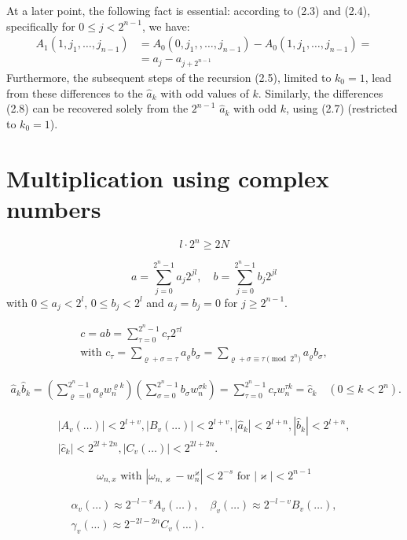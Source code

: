 \documentclass{article}
\begin{document}
At a later point, the following fact is essential: according to (2.3) and (2.4), specifically for $0 \le j < 2^{n - 1}$, we have:
\begin{align*}
\tag{2.8}
A_1(1, j_1, \ldots, j_{n - 1}) &= A_0(0, j_1,, \ldots, j_{n - 1}) - A_0(1, j_1, \ldots, j_{n - 1})  = \\
&= a_j - a_{j + 2^{n - 1}}
\end{align*}
Furthermore, the subsequent steps of the recursion (2.5), limited to $k_0 = 1$, lead from these differences to the $\hat{a}_k$ with odd values of $k$. Similarly, the differences (2.8) can be recovered solely from the $2^{n - 1}$ $\hat{a}_k$ with odd $k$, using (2.7) (restricted to $k_0 = 1$).

\section{Multiplication using complex numbers}
\[
\tag{3.1}
l \cdot 2^n \ge 2N
\]

\[
\tag{3.2}
a = \sum_{j = 0}^{2^n - 1} a_j 2^{jl}, \quad b = \sum_{j = 0}^{2^n - 1} b_j 2^{jl}
\] with $0 \le a_j < 2^l$, $0 \le b_j < 2^l$ and $a_j = b_j = 0$ for $j \ge 2^{n - 1}$.

\[
\tag{3.3}
\begin{gathered}
c = ab = \sum_{\tau = 0}^{2^n - 1} c_\tau 2^{\tau l} \\
\text{with }c_\tau = \sum_{\varrho + \sigma = \tau} a_\varrho b_\sigma = \sum_{\varrho + \sigma \equiv \tau \pmod{2^n}} a_\varrho b_\sigma,
\end{gathered}
\]

\[
\tag{3.4}
\begin{gathered}
\hat{a}_k \hat{b}_k = \left(\sum_{\varrho = 0}^{2^n - 1} a_\varrho w_n^{\varrho k}\right) \left(\sum_{\sigma = 0}^{2^n - 1} b_\sigma w_n^{\sigma k}\right) = \sum_{\tau = 0}^{2^n - 1} c_\tau w_n^{\tau k} = \hat{c}_k \quad (0 \le k < 2^n).
\end{gathered}
\]

\[
\begin{gathered}
|A_v(\ldots)| < 2^{l + v}, |B_v(\ldots)| < 2^{l + v}, |\hat{a}_k| < 2^{l + n}, |\hat{b}_k| < 2^{l + n}, \\
|\hat{c}_k| < 2^{2l + 2n}, |C_v(\ldots)| < 2^{2l + 2n}.
\end{gathered}
\]

\[
\omega_{n, x}\text{ with }|\omega_{n, \varkappa} - w_n^\varkappa| < 2^{-s}\text{ for }|\varkappa| < 2^{n - 1}
\]

\[
\begin{gathered}
\alpha_v (\ldots) \approx 2^{-l - v} A_v(\ldots), \quad \beta_v(\ldots) \approx 2^{-l - v} B_v(\ldots), \\
\gamma_v(\ldots) \approx 2^{-2l - 2n} C_v (\ldots).
\end{gathered}
\]
\end{document}
